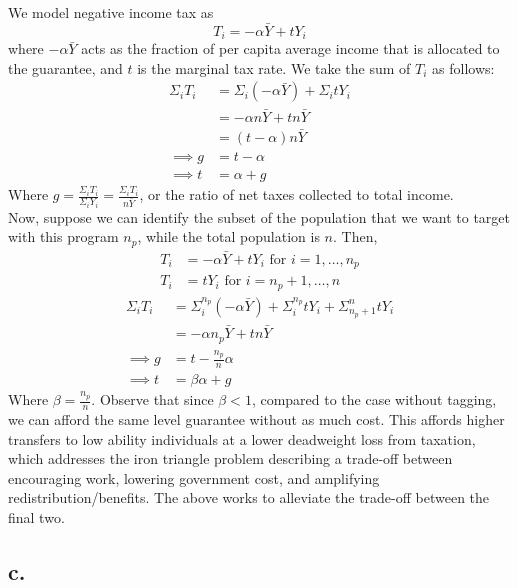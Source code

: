 \documentclass[
]{article}
\begin{document}
We model negative income tax as \[T_i = -\alpha \bar{Y} + t Y_i\] where
\(-\alpha \bar{Y}\) acts as the fraction of per capita average income
that is allocated to the guarantee, and \(t\) is the marginal tax rate.
We take the sum of \(T_i\) as follows: \[\begin{aligned}
\Sigma _i T_i &= \Sigma _i (-\alpha \bar{Y}) + \Sigma_i t Y_i \\
&= -\alpha n \bar{Y} + t n\bar{Y} \\
&= (t-\alpha)n\bar{Y} \\
\implies g &= t - \alpha \\
\implies t &= \alpha + g
\end{aligned}\] Where
\(g = \frac{\Sigma_i T_i}{\Sigma_i Y_i} = \frac{\Sigma_i T_i}{n\bar{Y}}\),
or the ratio of net taxes collected to total income.\\
Now, suppose we can identify the subset of the population that we want
to target with this program \(n_p\), while the total population is
\(n\). Then, \[\begin{aligned}
T_i &= -\alpha \bar{Y} + t Y_i \text{ for } i = 1, \dots, n_p \\
T_i &= t Y_i \text{ for } i = n_p + 1, \dots, n
\end{aligned}\] \[\begin{aligned}
\Sigma _i T_i &= \Sigma _i ^{n_p} (-\alpha \bar{Y}) + \Sigma_i ^ {n_p} t Y_i  + \Sigma _{n_p + 1} ^ n t Y_i\\
&= -\alpha n_p \bar{Y} + t n\bar{Y} \\
\implies g &= t - \frac{n_p}{n}\alpha \\
\implies t &= \beta\alpha + g
\end{aligned}\] Where \(\beta = \frac{n_p}{n}\). Observe that since
\(\beta < 1\), compared to the case without tagging, we can afford the
same level guarantee without as much cost. This affords higher transfers
to low ability individuals at a lower deadweight loss from taxation,
which addresses the iron triangle problem describing a trade-off between
encouraging work, lowering government cost, and amplifying
redistribution/benefits. The above works to alleviate the trade-off
between the final two.\\
\newpage

\hypertarget{c.-2}{%
\subsection{c.~}\label{c.-2}}
\end{document}
